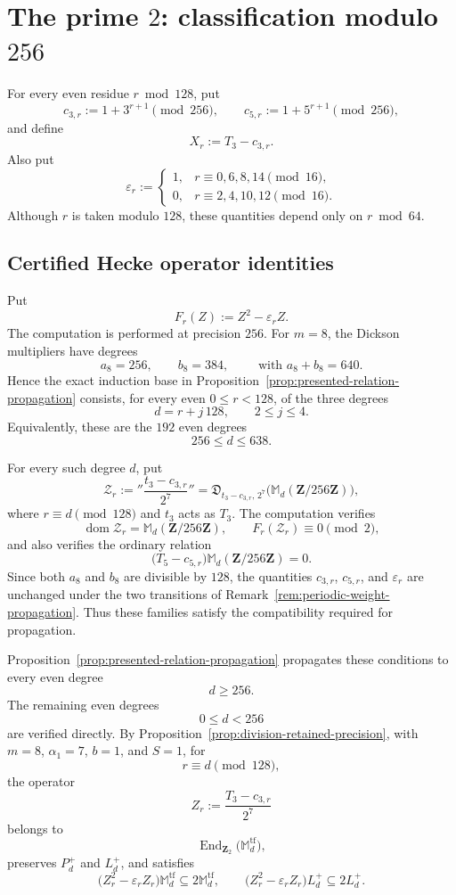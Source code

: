 \documentclass[11pt]{article}
\newcommand{\End}{\operatorname{End}}
\theoremstyle{plain}
\theoremstyle{definition}
\theoremstyle{remark}
\numberwithin{equation}{section}
\begin{document}
\section{The prime \texorpdfstring{\(2\)}{2}: classification modulo \texorpdfstring{\(256\)}{256}}
\label{sec:p2}

For every even residue \(r\bmod128\), put \[ c_{3,r}:=1+3^{r+1}\pmod{256}, \qquad c_{5,r}:=1+5^{r+1}\pmod{256}, \] and define \[ X_r:=T_3-c_{3,r}. \] Also put \[ \varepsilon_r:= \begin{cases} 1,&r\equiv0,6,8,14\pmod{16},\\ 0,&r\equiv2,4,10,12\pmod{16}. \end{cases} \] Although \(r\) is taken modulo \(128\), these quantities depend only on \(r\bmod64\).

\subsection{Certified Hecke operator identities}

Put \[ F_r(Z):=Z^2-\varepsilon_rZ. \] The computation is performed at precision \(256\).  For \(m=8\), the Dickson multipliers have degrees \[ a_8=256, \qquad b_8=384, \qquad \mbox{ with } a_8 + b_8 = 640. \] Hence the exact induction base in Proposition~\ref{prop:presented-relation-propagation} consists, for every even \(0\leq r<128\), of the three degrees \[ d=r+j\,128, \qquad 2\leq j\leq4. \] Equivalently, these are the \(192\) even degrees \[ 256\leq d\leq638. \] 

For every such degree \(d\), put \[ \mathcal Z_r:= ''\frac{t_3 - c_{3,r}}{2^7}'' = \mathfrak D_{t_3-c_{3,r},\,2^7} \bigl(\mathbb M_d(\mathbf Z/256\mathbf Z)\bigr), \] where \(r\equiv d\pmod{128}\) and \(t_3\) acts as \(T_3\). The computation \cite[\href{https://github.com/nrustom/hecke-congruences/blob/main/playground_mod_256.ipynb}{\nolinkurl{playground_mod_256.ipynb}}]{RustomHeckeCongruences} verifies \[ \operatorname{dom}\mathcal Z_r =\mathbb M_d(\mathbf Z/256\mathbf Z), \qquad F_r(\mathcal Z_r)\equiv0\pmod2, \] and also verifies the ordinary relation \[ \bigl(T_5-c_{5,r}\bigr) \mathbb M_d(\mathbf Z/256\mathbf Z)=0. \] Since both \(a_8\) and \(b_8\) are divisible by \(128\), the quantities \(c_{3,r}\), \(c_{5,r}\), and \(\varepsilon_r\) are unchanged under the two transitions of Remark~\ref{rem:periodic-weight-propagation}.  Thus these families satisfy the compatibility required for propagation.

Proposition~\ref{prop:presented-relation-propagation} propagates these conditions to every even degree \[ d\geq256. \] The remaining even degrees \[ 0\leq d<256 \] are verified directly. By Proposition~\ref{prop:division-retained-precision}, with \(m=8\), \(\alpha_1=7\), \(b=1\), and \(S=1\), for \[ r\equiv d\pmod{128}, \] the operator \[ Z_r:=\frac{T_3-c_{3,r}}{2^7} \] belongs to \[ \End_{\mathbf Z_2}\bigl(\mathbb M_d^{\mathrm{tf}}\bigr), \] preserves \(P_d^+\) and \(L_d^+\), and satisfies \begin{equation} \bigl(Z_r^2-\varepsilon_rZ_r\bigr) \mathbb M_d^{\mathrm{tf}} \subseteq2\mathbb M_d^{\mathrm{tf}}, \qquad \bigl(Z_r^2-\varepsilon_rZ_r\bigr)L_d^+ \subseteq2L_d^+. \label{eq:p2-divided-relation}\end{equation}
\end{document}
